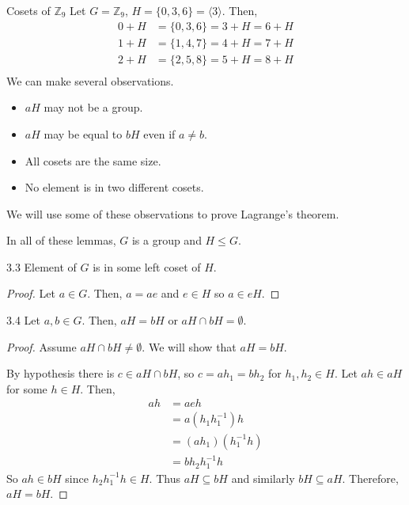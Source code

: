\documentclass[12pt]{article}
\newcommand{\Z}{\mathbb{Z}}
\newcommand{\inv}{^{-1}}
\begin{document}
	\begin{myex}{Cosets of $\Z_9$}{}
		Let $G=\Z_9$, $H=\{0, 3, 6\}=\langle 3\rangle$. Then,
		\begin{align*}
			0+H&=\{0, 3, 6\}=3+H=6+H\\
			1+H&=\{1, 4, 7\}=4+H=7+H\\
			2+H&=\{2, 5, 8\}=5+H=8+H\\
		\end{align*}
		We can make several observations.
		\begin{itemize}
			\item $aH$ may not be a group.
			\item $aH$ may be equal to $bH$ even if $a\neq b$.
			\item All cosets are the same size.
			\item No element is in two different cosets.
		\end{itemize}
		We will use some of these observations to prove Lagrange's theorem.
	\end{myex}
	
	In all of these lemmas, $G$ is a group and $H\leq G$.
	\begin{mylem}{}{3.3}
		Element of $G$ is in some left coset of $H$.
		\begin{proof}
			Let $a\in G$. Then, $a=ae$ and $e\in H$ so $a\in eH$.
		\end{proof}
	\end{mylem}
	
	\begin{mylem}{}{3.4}
		Let $a, b\in G$. Then, $aH=bH$ or $aH\cap bH=\emptyset$.
		\begin{proof}
			Assume $aH\cap bH\neq\emptyset$. We will show that $aH=bH$.
			
			By hypothesis there is $c\in aH\cap bH$, so $c=ah_1=bh_2$ for $h_1, h_2\in H$. Let $ah\in aH$ for some $h\in H$. Then,
			\begin{align*}
				ah&=aeh\\
				&=a(h_1h_1\inv)h\\
				&=(ah_1)(h_1\inv h)\\
				&=bh_2h_1\inv h
			\end{align*}
			So $ah\in bH$ since $h_2h_1\inv h\in H$. Thus $aH\subseteq bH$ and similarly $bH\subseteq aH$. Therefore, $aH=bH$.
		\end{proof}
	\end{mylem}
	
\end{document}

